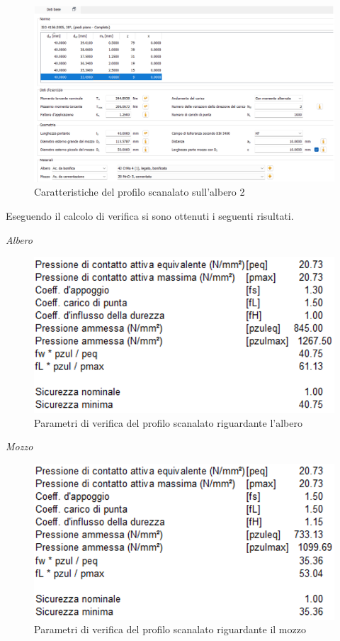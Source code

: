\begin{figure}[h]
    \centering
    \includegraphics[scale=0.5]{Immagini/Scanalato2.png}
    \caption{Caratteristiche del profilo scanalato sull'albero 2}
    \label{fig:Scanalato2}
\end{figure}

Eseguendo il calcolo di verifica si sono ottenuti i seguenti risultati.

\emph{Albero}
\begin{figure}[h]
    \centering
    \includegraphics[scale=0.5]{Immagini/RisultatiScanalatoAlbero2.png}
    \caption{Parametri  di verifica del profilo scanalato riguardante l'albero}
    \label{fig:RisultatiScanalatoAlbero2}
\end{figure}
\newpage
\emph{Mozzo}
\begin{figure}[h]
    \centering
    \includegraphics[scale=0.5]{Immagini/RisultatiScanalatoMozzo2.png}
    \caption{Parametri di verifica del profilo scanalato riguardante il mozzo}
    \label{fig:RisultatiScanalatoMozzo2}
\end{figure}

